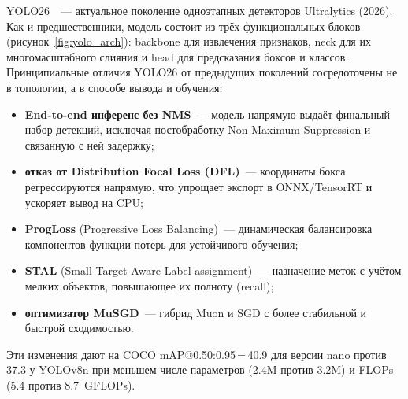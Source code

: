 \documentclass[10pt,a4paper]{report}
\numberwithin{equation}{chapter}
\numberwithin{figure}{chapter}
\numberwithin{table}{chapter}
\begin{document}
YOLO26~\cite{yolo26}~--- актуальное поколение одноэтапных детекторов
Ultralytics (2026). Как и предшественники, модель состоит из трёх
функциональных блоков (рисунок~\ref{fig:yolo_arch}): backbone для
извлечения признаков, neck для их многомасштабного слияния и head
для предсказания боксов и классов. Принципиальные отличия YOLO26 от
предыдущих поколений сосредоточены не в топологии, а в способе вывода
и обучения:
\begin{itemize}[nosep]
  \item \textbf{End-to-end инференс без NMS}~--- модель напрямую выдаёт
        финальный набор детекций, исключая постобработку Non-Maximum
        Suppression и связанную с ней задержку;
  \item \textbf{отказ от Distribution Focal Loss (DFL)}~--- координаты
        бокса регрессируются напрямую, что упрощает экспорт в
        ONNX/TensorRT и ускоряет вывод на CPU;
  \item \textbf{ProgLoss} (Progressive Loss Balancing)~--- динамическая
        балансировка компонентов функции потерь для устойчивого обучения;
  \item \textbf{STAL} (Small-Target-Aware Label assignment)~--- назначение
        меток с учётом мелких объектов, повышающее их полноту (recall);
  \item \textbf{оптимизатор MuSGD}~--- гибрид Muon и SGD с более
        стабильной и быстрой сходимостью.
\end{itemize}
Эти изменения дают на COCO mAP@0.50:0.95\,=\,40.9 для версии nano
против 37.3 у YOLOv8n при меньшем числе параметров (2.4M против 3.2M)
и FLOPs (5.4 против 8.7~GFLOPs).
\end{document}
